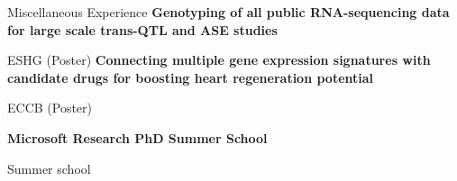 \begin{rubric}{Miscellaneous Experience}
\entry*[25 May 2016] \textbf{Genotyping of all public RNA-sequencing data for large scale trans-QTL and ASE studies} \par
ESHG (Poster)
%
\entry*[8 Sep 2014] \textbf{Connecting multiple gene expression signatures with candidate drugs for boosting heart regeneration potential} \par
ECCB (Poster)

\entry*[Jul 2016] \textbf{Microsoft Research PhD Summer School} \par
Summer school

\end{rubric}